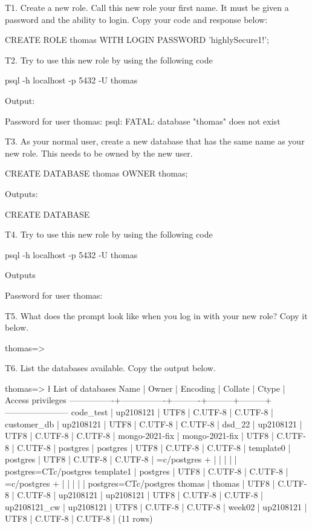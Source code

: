 
T1. Create a new role. Call this new role your first name. It must be given a password and the ability to login. Copy your code and response below:
\begin{sql}
CREATE ROLE thomas WITH LOGIN PASSWORD 'highlySecure1!';
\end{sql}

T2. Try to use this new role by using the following code
\begin{pseudo}
psql -h localhost -p 5432 -U thomas
\end{pseudo}
Output:
\begin{pseudo}
Password for user thomas:
psql: FATAL:  database "thomas" does not exist
\end{pseudo}

T3. As your normal user, create a new database that has the same name as your new role. This needs to be owned by the new user. 
\begin{sql}
CREATE DATABASE thomas OWNER thomas;
\end{sql}
Outputs:
\begin{pseudo}
CREATE DATABASE
\end{pseudo}

T4. Try to use this new role by using the following code
\begin{pseudo}
psql -h localhost -p 5432 -U thomas
\end{pseudo}
Outputs
\begin{pseudo}
Password for user thomas:
\end{pseudo}
T5. What does the prompt look like when you log in with your new role? Copy it below.
\begin{pseudo}
thomas=>
\end{pseudo}

T6. List the databases available. Copy the output below.
\begin{pseudo}
thomas=> \l
                                   List of databases
      Name      |     Owner      | Encoding | Collate |  Ctype  |   Access privileges
----------------+----------------+----------+---------+---------+-----------------------
 code_test      | up2108121      | UTF8     | C.UTF-8 | C.UTF-8 |
 customer_db    | up2108121      | UTF8     | C.UTF-8 | C.UTF-8 |
 dsd_22         | up2108121      | UTF8     | C.UTF-8 | C.UTF-8 |
 mongo-2021-fix | mongo-2021-fix | UTF8     | C.UTF-8 | C.UTF-8 |
 postgres       | postgres       | UTF8     | C.UTF-8 | C.UTF-8 |
 template0      | postgres       | UTF8     | C.UTF-8 | C.UTF-8 | =c/postgres          +
                |                |          |         |         | postgres=CTc/postgres
 template1      | postgres       | UTF8     | C.UTF-8 | C.UTF-8 | =c/postgres          +
                |                |          |         |         | postgres=CTc/postgres
 thomas         | thomas         | UTF8     | C.UTF-8 | C.UTF-8 |
 up2108121      | up2108121      | UTF8     | C.UTF-8 | C.UTF-8 |
 up2108121_cw   | up2108121      | UTF8     | C.UTF-8 | C.UTF-8 |
 week02         | up2108121      | UTF8     | C.UTF-8 | C.UTF-8 |
(11 rows)
\end{pseudo}

